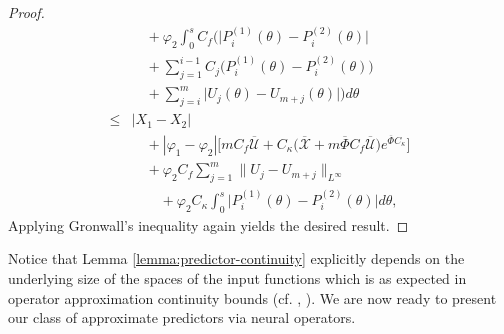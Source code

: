 \documentclass[letterpaper, 10 pt, conference]{ieeeconf}  %
\begin{document}
\begin{proof}
\begin{align}
            &\quad + \varphi_2 \int_{0}^s C_f \Biggl( \bigg| P_i^{(1)}(\theta) - P_i^{(2)}(\theta) \bigg| \nonumber \\
            &\quad  + \sum_{j=1}^{i-1} C_j \bigg( P_i^{(1)}(\theta) - P_i^{(2)}(\theta) \bigg) \nonumber \\ 
            & \quad + \sum_{j=i}^m \bigg| U_j(\theta) - U_{m+j}(\theta) \bigg| \Biggr) d\theta \nonumber \\
        \leq& |X_1 - X_2| \nonumber \\
            &\quad + |\varphi_1 - \varphi_2| \bigg[ m C_f \overline{\mathcal{U}} + C_{\kappa} \bigg( \overline{\mathcal{X}} + m \overline{\Phi} C_f \overline{\mathcal{U}} \bigg) e^{\overline{\Phi} C_{\kappa}} \bigg] \nonumber \\
            &\quad + \varphi_2 C_f \sum_{j=1}^m \| U_j - U_{m+j} \|_{L^\infty} \nonumber \\
            &\qquad + \varphi_2 C_{\kappa} \int_0^s \bigg| P_i^{(1)}(\theta) - P_i^{(2)}(\theta) \bigg| d\theta, \label{eq:setup_for_gronwall}
\end{align}
Applying Gronwall's inequality again yields the desired result.
\end{proof}

Notice that Lemma \ref{lemma:predictor-continuity} explicitly depends on the underlying size of the spaces of the input functions which is as expected in operator approximation continuity bounds (cf. \cite[Lemma 1]{Luke_gain:2024}, \cite[Lemma 2]{Max_gain_schedule:2025}). We are now ready to present our class of approximate predictors via neural operators. 
\end{document}
